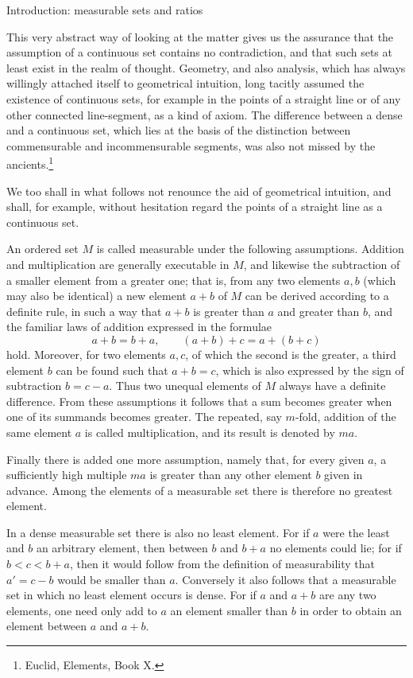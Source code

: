 \documentclass[11pt]{article}
\begin{document}
\begin{center}{\Large Introduction: measurable sets and ratios}\end{center}

This very abstract way of looking at the matter gives us the assurance that the assumption of a continuous set contains no contradiction, and that such sets at least exist in the realm of thought. Geometry, and also analysis, which has always willingly attached itself to geometrical intuition, long tacitly assumed the existence of continuous sets, for example in the points of a straight line or of any other connected line-segment, as a kind of axiom. The difference between a dense and a continuous set, which lies at the basis of the distinction between commensurable and incommensurable segments, was also not missed by the ancients.\footnote{Euclid, Elements, Book X.}

We too shall in what follows not renounce the aid of geometrical intuition, and shall, for example, without hesitation regard the points of a straight line as a continuous set.

An ordered set $M$ is called measurable under the following assumptions. Addition and multiplication are generally executable in $M$, and likewise the subtraction of a smaller element from a greater one; that is, from any two elements $a,b$ (which may also be identical) a new element $a+b$ of $M$ can be derived according to a definite rule, in such a way that $a+b$ is greater than $a$ and greater than $b$, and the familiar laws of addition expressed in the formulae
\[
 a+b=b+a,
 \qquad (a+b)+c=a+(b+c)
\]
hold. Moreover, for two elements $a,c$, of which the second is the greater, a third element $b$ can be found such that $a+b=c$, which is also expressed by the sign of subtraction $b=c-a$. Thus two unequal elements of $M$ always have a definite difference. From these assumptions it follows that a sum becomes greater when one of its summands becomes greater. The repeated, say $m$-fold, addition of the same element $a$ is called multiplication, and its result is denoted by $ma$.

Finally there is added one more assumption, namely that, for every given $a$, a sufficiently high multiple $ma$ is greater than any other element $b$ given in advance. Among the elements of a measurable set there is therefore no greatest element.

In a dense measurable set there is also no least element. For if $a$ were the least and $b$ an arbitrary element, then between $b$ and $b+a$ no elements could lie; for if $b<c<b+a$, then it would follow from the definition of measurability that $a'=c-b$ would be smaller than $a$. Conversely it also follows that a measurable set in which no least element occurs is dense. For if $a$ and $a+b$ are any two elements, one need only add to $a$ an element smaller than $b$ in order to obtain an element between $a$ and $a+b$.
\end{document}
